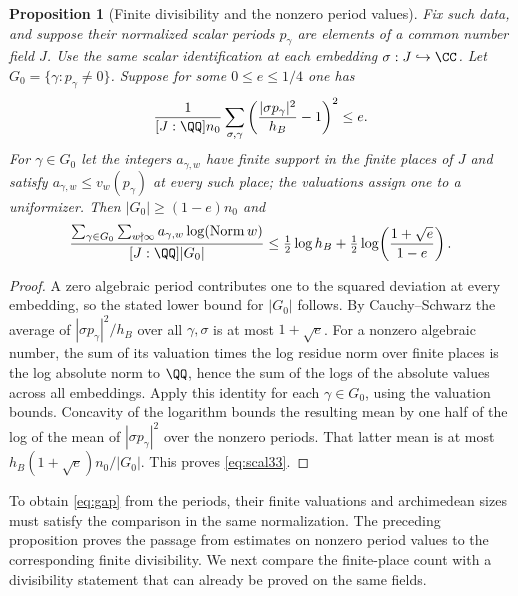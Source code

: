 \documentclass[a4paper,11pt]{article}
\newtheorem{proposition}{Proposition}[section]
\theoremstyle{definition}
\theoremstyle{remark}
\numberwithin{equation}{section}
\begin{document}
\begin{proposition}[Finite divisibility and the nonzero period values]\leavevmode\label{prop:prod33}
Fix such data, and suppose their normalized scalar periods \(p_\gamma\) are elements of a common number field \(J\). Use the same scalar identification at each embedding \(\sigma:J\hookrightarrow\CC\). Let \(G_0=\{\gamma:p_\gamma\ne0\}\). Suppose for some \(0\le e\le1/4\) one has
\[
 \frac{1}{[J:\QQ] n_0}\sum_{\sigma,\gamma}
       \left(\frac{|\sigma p_\gamma|^2}{h_B}-1\right)^2\le e .
\]
For \(\gamma\in G_0\) let the integers \(a_{\gamma,w}\) have finite support in the finite places of \(J\) and satisfy \(a_{\gamma,w}\le v_w(p_\gamma)\) at every such place; the valuations assign one to a uniformizer. Then \(|G_0|\ge(1-e)n_0\) and
\begin{equation}
 \frac{\sum_{\gamma\in G_0}\sum_{w\nmid\infty} a_{\gamma,w}
                        \log(\operatorname{Norm} w)}
      {[J:\QQ]|G_0|}
 \le\tfrac12\log h_B+
             \tfrac12\log\!\left(\frac{1+\sqrt e}{1-e}\right).
                                                               \label{eq:scal33}
\end{equation}
\end{proposition}
\begin{proof}
A zero algebraic period contributes one to the squared deviation at every embedding, so the stated lower bound for \(|G_0|\) follows. By Cauchy--Schwarz the average of \(|\sigma p_\gamma|^2/h_B\) over all \(\gamma,\sigma\) is at most \(1+\sqrt e\). For a nonzero algebraic number, the sum of its valuation times the log residue norm over finite places is the log absolute norm to \(\QQ\), hence the sum of the logs of the absolute values across all embeddings. Apply this identity for each \(\gamma\in G_0\), using the valuation bounds. Concavity of the logarithm bounds the resulting mean by one half of the log of the mean of \(|\sigma p_\gamma|^2\) over the nonzero periods. That latter mean is at most \(h_B(1+\sqrt e)n_0/|G_0|\). This proves \eqref{eq:scal33}.
\end{proof}

To obtain \eqref{eq:gap} from the periods, their finite valuations and archimedean sizes must satisfy the comparison in the same normalization. The preceding proposition proves the passage from estimates on nonzero period values to the corresponding finite divisibility. We next compare the finite-place count with a divisibility statement that can already be proved on the same fields.
\end{document}

